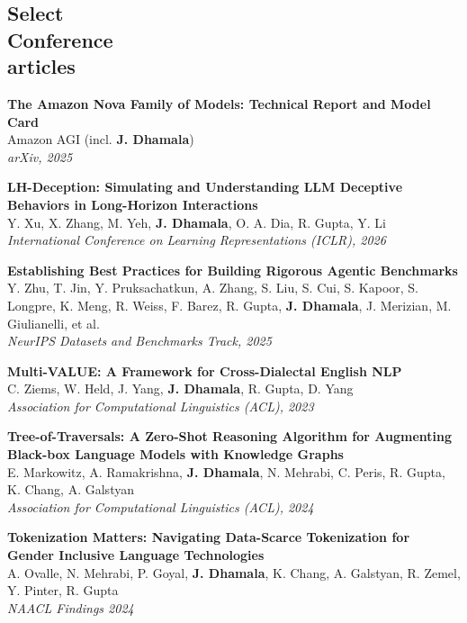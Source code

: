 \documentclass[margin]{res}
\begin{document}
\begin{resume}


\section{Select\\Conference\\articles}
\textbf{The Amazon Nova Family of Models: Technical Report and Model Card}\\
\small{Amazon AGI (incl. \textbf{J. Dhamala})}\\
{\sl arXiv, 2025}

\textbf{LH-Deception: Simulating and Understanding LLM Deceptive Behaviors in Long-Horizon Interactions}\\
\small{Y. Xu, X. Zhang, M. Yeh, \textbf{J. Dhamala}, O. A. Dia, R. Gupta, Y. Li}\\
{\sl International Conference on Learning Representations (ICLR), 2026}

\textbf{Establishing Best Practices for Building Rigorous Agentic Benchmarks}\\
\small{Y. Zhu, T. Jin, Y. Pruksachatkun, A. Zhang, S. Liu, S. Cui, S. Kapoor, S. Longpre, K. Meng, R. Weiss, F. Barez, R. Gupta, \textbf{J. Dhamala}, J. Merizian, M. Giulianelli, et al.}\\
{\sl NeurIPS Datasets and Benchmarks Track, 2025}

\textbf{Multi-VALUE: A Framework for Cross-Dialectal English NLP}\\
\small{C. Ziems, W. Held, J. Yang, \textbf{J. Dhamala}, R. Gupta, D. Yang}\\
{\sl Association for Computational Linguistics (ACL), 2023}

\textbf{Tree-of-Traversals: A Zero-Shot Reasoning Algorithm for Augmenting Black-box Language Models with Knowledge Graphs}\\
\small{E. Markowitz, A. Ramakrishna, \textbf{J. Dhamala}, N. Mehrabi, C. Peris, R. Gupta,  K. Chang, A. Galstyan}\\
{\sl Association for Computational Linguistics (ACL), 2024}

\textbf{Tokenization Matters: Navigating Data-Scarce Tokenization for Gender Inclusive Language Technologies}\\
\small{A. Ovalle, N. Mehrabi,  P. Goyal, \textbf{J. Dhamala},  K. Chang, A. Galstyan, R. Zemel, Y. Pinter, R. Gupta}\\
{\sl NAACL Findings 2024}


\end{resume}
\end{document}
